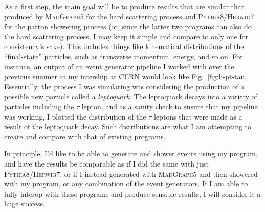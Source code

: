 As a first step, the main goal will be to produce results that are similar that produced by \textsc{MadGraph5} for the hard scattering process and \textsc{Pythia8}/\textsc{Herwig7} for the parton showering process (or, since the latter two programs can also do the hard scattering process, I may keep it simple and compare to only one for consistency's sake). This includes things like kinematical distributions of the ``final-state'' particles, such as transverse momentum, energy, and so on. For instance, an output of an event generator pipeline I worked with over the previous summer at my intership at CERN would look like Fig.~\ref{fig:h-pt-tau}. Essentially, the process I was simulating was considering the production of a possible new particle called a \textit{leptoquark}. The leptoquark decays into a variety of particles including the $\tau$ lepton, and as a sanity check to ensure that my pipeline was working, I plotted the distribution of the $\tau$ leptons that were made as a result of the leptoquark decay. Such distributions are what I am attempting to create and compare with that of existing programs.

In principle, I'd like to be able to generate and shower events using my program, and have the results be comparable as if I did the same with just \textsc{Pythia8}/\textsc{Herwig7}, or if I instead generated with \textsc{MadGraph5} and then showered with my program, or any combination of the event generators. If I am able to fully interop with these programs and produce sensible results, I will consider it a huge success.


